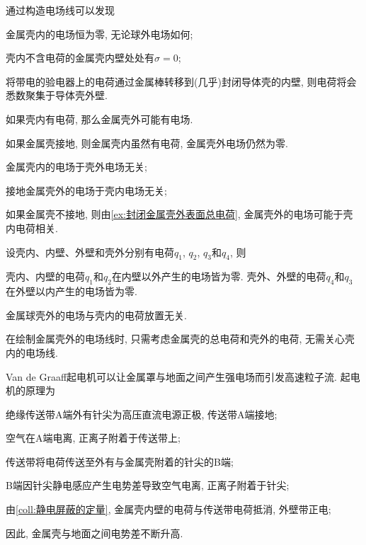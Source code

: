\documentclass[../Electromagnetism.tex]{subfiles}
\begin{document}
通过构造电场线可以发现
\begin{finale}
	\begin{corollary}[金属壳内的电场]\quad
		\begin{cenum}
			\item 金属壳内的电场恒为零, 无论球外电场如何;
			\item 壳内不含电荷的金属壳内壁处处有$\sigma = 0$;
		\end{cenum}
	\end{corollary}
\end{finale}
\begin{ex}
	将带电的验电器上的电荷通过金属棒转移到(几乎)封闭导体壳的内壁, 则电荷将会悉数聚集于导体壳外壁.
\end{ex}
如果壳内有电荷, 那么金属壳外可能有电场.
\begin{ex}
	如果金属壳接地, 则金属壳内虽然有电荷, 金属壳外电场仍然为零.
\end{ex}
\begin{finale}
	\begin{corollary}[静电屏蔽]\quad
		\begin{cenum}
			\item 金属壳内的电场于壳外电场无关;
			\item 接地金属壳外的电场于壳内电场无关;
		\end{cenum}
	\end{corollary}
\end{finale}
\begin{ex}
	如果金属壳不接地, 则由\cref{ex:封闭金属壳外表面总电荷}, 金属壳外的电场可能于壳内电荷相关.
\end{ex}
\begin{corollary}[静电屏蔽的定量]
	\label{coll:静电屏蔽的定量}
	设壳内、内壁、外壁和壳外分别有电荷$q_1$, $q_2$, $q_3$和$q_4$, 则
	\begin{finale}
		壳内、内壁的电荷$q_1$和$q_2$在内壁以外产生的电场皆为零. 壳外、外壁的电荷$q_4$和$q_3$在外壁以内产生的电场皆为零. 
	\end{finale}
\end{corollary}
\begin{ex}
	金属球壳外的电场与壳内的电荷放置无关.
\end{ex}
\begin{remark}
	在绘制金属壳外的电场线时, 只需考虑金属壳的总电荷和壳外的电荷, 无需关心壳内的电场线.
\end{remark}
\begin{ex}
	Van de Graaff起电机可以让金属罩与地面之间产生强电场而引发高速粒子流. 起电机的原理为
	\begin{cenum}
		\item 绝缘传送带A端外有针尖为高压直流电源正极, 传送带A端接地;
		\item 空气在A端电离, 正离子附着于传送带上;
		\item 传送带将电荷传送至外有与金属壳附着的针尖的B端;
		\item B端因针尖静电感应产生电势差导致空气电离, 正离子附着于针尖;
		\item 由\cref{coll:静电屏蔽的定量}, 金属壳内壁的电荷与传送带电荷抵消, 外壁带正电;
		\item 因此, 金属壳与地面之间电势差不断升高.
	\end{cenum}
\end{ex}
\end{document}
